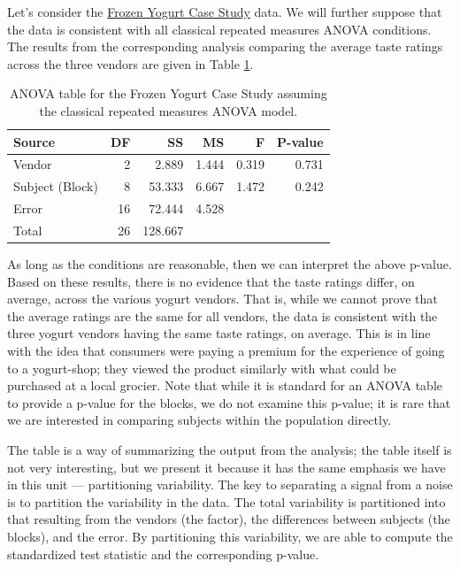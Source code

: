 \documentclass[]{book}
\theoremstyle{plain}
\theoremstyle{mydefn}
\theoremstyle{myexmpl}
\theoremstyle{remark}
\begin{document}
Let's consider the \protect\hyperlink{CaseYogurt}{Frozen Yogurt Case
Study} data. We will further suppose that the data is consistent with
all classical repeated measures ANOVA conditions. The results from the
corresponding analysis comparing the average taste ratings across the
three vendors are given in Table
\ref{tab:blockteststat-yogurt-anova-table}.

\begin{table}

\caption{\label{tab:blockteststat-yogurt-anova-table}ANOVA table for the Frozen Yogurt Case Study assuming the classical repeated measures ANOVA model.}
\centering
\begin{tabular}[t]{l|r|r|r|r|r}
\hline
Source & DF & SS & MS & F & P-value\\
\hline
Vendor & 2 & 2.889 & 1.444 & 0.319 & 0.731\\
\hline
Subject (Block) & 8 & 53.333 & 6.667 & 1.472 & 0.242\\
\hline
Error & 16 & 72.444 & 4.528 &  & \\
\hline
Total & 26 & 128.667 &  &  & \\
\hline
\end{tabular}
\end{table}

As long as the conditions are reasonable, then we can interpret the
above p-value. Based on these results, there is no evidence that the
taste ratings differ, on average, across the various yogurt vendors.
That is, while we cannot prove that the average ratings are the same for
all vendors, the data is consistent with the three yogurt vendors having
the same taste ratings, on average. This is in line with the idea that
consumers were paying a premium for the experience of going to a
yogurt-shop; they viewed the product similarly with what could be
purchased at a local grocier. Note that while it is standard for an
ANOVA table to provide a p-value for the blocks, we do not examine this
p-value; it is rare that we are interested in comparing subjects within
the population directly.

The table is a way of summarizing the output from the analysis; the
table itself is not very interesting, but we present it because it has
the same emphasis we have in this unit --- partitioning variability. The
key to separating a signal from a noise is to partition the variability
in the data. The total variability is partitioned into that resulting
from the vendors (the factor), the differences between subjects (the
blocks), and the error. By partitioning this variability, we are able to
compute the standardized test statistic and the corresponding p-value.
\end{document}
